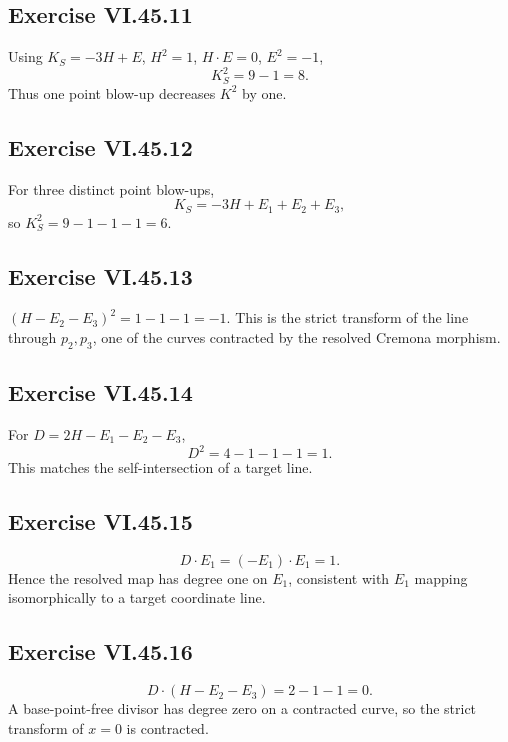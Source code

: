 \subsection*{Exercise VI.45.11}
\begin{solution}
Using \(K_S=-3H+E\), \(H^2=1\), \(H\cdot E=0\), \(E^2=-1\),
\[
K_S^2=9-1=8.
\]
Thus one point blow-up decreases \(K^2\) by one.
\end{solution}

\subsection*{Exercise VI.45.12}
\begin{solution}
For three distinct point blow-ups,
\[
K_S=-3H+E_1+E_2+E_3,
\]
so \(K_S^2=9-1-1-1=6\).
\end{solution}

\subsection*{Exercise VI.45.13}
\begin{solution}
\((H-E_2-E_3)^2=1-1-1=-1\).  This is the strict transform of the line through \(p_2,p_3\), one of the curves contracted by the resolved Cremona morphism.
\end{solution}

\subsection*{Exercise VI.45.14}
\begin{solution}
For \(D=2H-E_1-E_2-E_3\),
\[
D^2=4-1-1-1=1.
\]
This matches the self-intersection of a target line.
\end{solution}

\subsection*{Exercise VI.45.15}
\begin{solution}
\[
D\cdot E_1=(-E_1)\cdot E_1=1.
\]
Hence the resolved map has degree one on \(E_1\), consistent with \(E_1\) mapping isomorphically to a target coordinate line.
\end{solution}

\subsection*{Exercise VI.45.16}
\begin{solution}
\[
D\cdot(H-E_2-E_3)=2-1-1=0.
\]
A base-point-free divisor has degree zero on a contracted curve, so the strict transform of \(x=0\) is contracted.
\end{solution}

